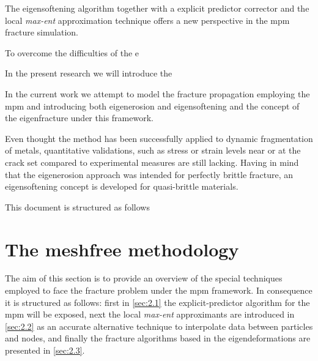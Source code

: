 \documentclass[preprint,12pt,a4paper]{elsarticle}
\begin{document}
The eigensoftening algorithm together with a explicit predictor
corrector and the local \textit{max-ent} approximation technique
offers a new perspective in the \acrshort{mpm} fracture simulation.

To overcome the difficulties of the e

In the present research we will introduce the 

In the current work we attempt to model the fracture propagation
employing the \acrshort{mpm} and introducing both eigenerosion and eigensoftening
\cite{Navas_2017_ES,Navas_2018_ES} and the concept of the
eigenfracture under this framework.

Even thought the method has been successfully applied to dynamic
fragmentation of metals, quantitative validations, such as stress or 
strain levels near or at the crack set compared to experimental
measures are still lacking. Having in mind that the eigenerosion
approach was intended for perfectly brittle fracture, an
eigensoftening concept is developed for quasi-brittle materials.

This document is structured as follows 

\section{The meshfree methodology}
\label{sec:2}
The aim of this section is to provide an overview of the special
techniques employed to face the fracture problem under the \acrshort{mpm}
framework. In consequence it is structured as follows: first in
\ref{sec:2.1} the explicit-predictor algorithm for the \acrshort{mpm} will be exposed, next the local \textit{max-ent} approximants are introduced in
\ref{sec:2.2} as an accurate alternative technique to interpolate data
between particles and nodes, and finally the fracture algorithms based
in the eigendeformations are presented in \ref{sec:2.3}.
\end{document}
